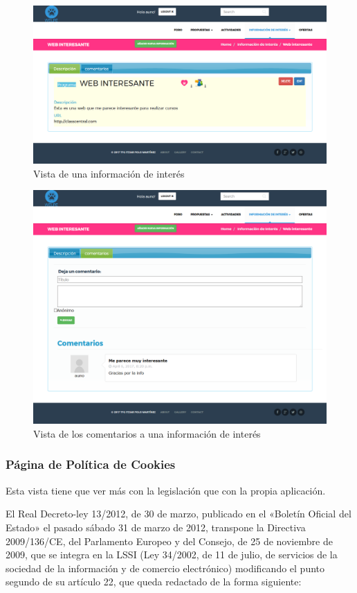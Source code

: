 \begin{figure}[H]
   \centering
   \includegraphics[width=12cm]{img/info_interes}
   \caption{Vista de una información de interés}
   \label{figura:info_interes}
\end{figure}
\begin{figure}[H]
   \centering
   \includegraphics[width=12cm]{img/info_interes_comment}
   \caption{Vista de los comentarios a una información de interés}
   \label{figura:info_interes_comment}
\end{figure}

\subsubsection{Página de Política de Cookies}
\label{subsubsec:cookies}


Esta vista tiene que ver más con la legislación que con la propia aplicación.


El Real Decreto-ley 13/2012, de 30 de marzo, publicado en el «Boletín Oficial del Estado» el pasado sábado 31 de marzo de 2012, transpone la Directiva 2009/136/CE, del Parlamento Europeo y del Consejo, de 25 de noviembre de 2009, que se integra en la LSSI (Ley 34/2002, de 11 de julio, de servicios de la sociedad de la información y de comercio electrónico) modificando el punto segundo de su artículo 22, que queda redactado de la forma siguiente:


